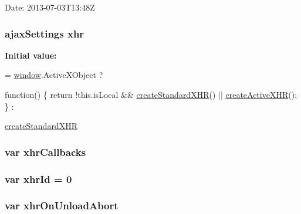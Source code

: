 Date\-: 2013-\/07-\/03\-T13\-:48\-Z \hypertarget{jquery-1_810_82_8js_a0b7a5cb538ca9913b1b3b1c807ad06f0}{
\subsubsection[{xhr}]{ {\bf ajax\-Settings} xhr}}\label{jquery-1_810_82_8js_a0b7a5cb538ca9913b1b3b1c807ad06f0}
{\bfseries Initial value\-:}
\begin{DoxyCode}
= \hyperlink{jquery-1_810_82_8js_a04a8a2bbfa9c15500892b8e5033d625b}{window}.ActiveXObject ?
    
    \textcolor{keyword}{function}() \{
        \textcolor{keywordflow}{return} !this.isLocal && \hyperlink{jquery-1_810_82_8js_acea019a8b67e4d114deb75d1e0b3474a}{createStandardXHR}() || 
      \hyperlink{jquery-1_810_82_8js_a54bf63f1b5f905292db45a1d6a9dc300}{createActiveXHR}();
    \} :
    
    \hyperlink{jquery-1_810_82_8js_acea019a8b67e4d114deb75d1e0b3474a}{createStandardXHR}
\end{DoxyCode}
\hypertarget{jquery-1_810_82_8js_a068f27a70831ff3a9e0ffa79e063847f}{
\subsubsection[{xhr\-Callbacks}]{\setlength{\rightskip}{0pt plus 5cm}var xhr\-Callbacks}}\label{jquery-1_810_82_8js_a068f27a70831ff3a9e0ffa79e063847f}
\hypertarget{jquery-1_810_82_8js_aa23ed64cf7afc9b028419517bf23fcea}{
\subsubsection[{xhr\-Id}]{\setlength{\rightskip}{0pt plus 5cm}var xhr\-Id = 0}}\label{jquery-1_810_82_8js_aa23ed64cf7afc9b028419517bf23fcea}
\hypertarget{jquery-1_810_82_8js_a271c099ab18ab35c15cac2faa2a097aa}{
\subsubsection[{xhr\-On\-Unload\-Abort}]{\setlength{\rightskip}{0pt plus 5cm}var xhr\-On\-Unload\-Abort}}\label{jquery-1_810_82_8js_a271c099ab18ab35c15cac2faa2a097aa}
